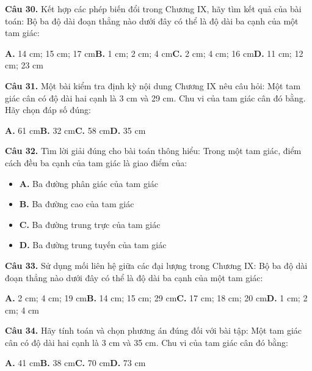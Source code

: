 \documentclass[11pt,a4paper]{article}
\begin{document}
\textbf{\color{primary} Câu 30.} Kết hợp các phép biến đổi trong Chương IX, hãy tìm kết quả của bài toán: Bộ ba độ dài đoạn thẳng nào dưới đây có thể là độ dài ba cạnh của một tam giác:\par
\hspace*{1.5em}\textbf{A.} 14 cm; 15 cm; 17 cm\quad\quad \textbf{B.} 1 cm; 2 cm; 4 cm\quad\quad \textbf{C.} 2 cm; 4 cm; 16 cm\quad\quad \textbf{D.} 11 cm; 12 cm; 23 cm\par\vspace{2pt}
\textbf{\color{primary} Câu 31.} Một bài kiểm tra định kỳ nội dung Chương IX nêu câu hỏi: Một tam giác cân có độ dài hai cạnh là 3 cm và 29 cm. Chu vi của tam giác cân đó bằng. Hãy chọn đáp số đúng:\par
\hspace*{1.5em}\textbf{A.} 61 cm\quad\quad \textbf{B.} 32 cm\quad\quad \textbf{C.} 58 cm\quad\quad \textbf{D.} 35 cm\par\vspace{2pt}
\textbf{\color{primary} Câu 32.} Tìm lời giải đúng cho bài toán thông hiểu: Trong một tam giác, điểm cách đều ba cạnh của tam giác là giao điểm của:\par
\begin{itemize}\setlength{\itemsep}{1pt}\setlength{\parskip}{0pt}
  \item[] \textbf{A.} Ba đường phân giác của tam giác
  \item[] \textbf{B.} Ba đường cao của tam giác
  \item[] \textbf{C.} Ba đường trung trực của tam giác
  \item[] \textbf{D.} Ba đường trung tuyến của tam giác
\end{itemize}\vspace{2pt}
\textbf{\color{primary} Câu 33.} Sử dụng mối liên hệ giữa các đại lượng trong Chương IX: Bộ ba độ dài đoạn thẳng nào dưới đây có thể là độ dài ba cạnh của một tam giác:\par
\hspace*{1.5em}\textbf{A.} 2 cm; 4 cm; 19 cm\quad\quad \textbf{B.} 14 cm; 15 cm; 29 cm\quad\quad \textbf{C.} 17 cm; 18 cm; 20 cm\quad\quad \textbf{D.} 1 cm; 2 cm; 4 cm\par\vspace{2pt}
\textbf{\color{primary} Câu 34.} Hãy tính toán và chọn phương án đúng đối với bài tập: Một tam giác cân có độ dài hai cạnh là 3 cm và 35 cm. Chu vi của tam giác cân đó bằng:\par
\hspace*{1.5em}\textbf{A.} 41 cm\quad\quad \textbf{B.} 38 cm\quad\quad \textbf{C.} 70 cm\quad\quad \textbf{D.} 73 cm\par\vspace{2pt}
\end{document}
